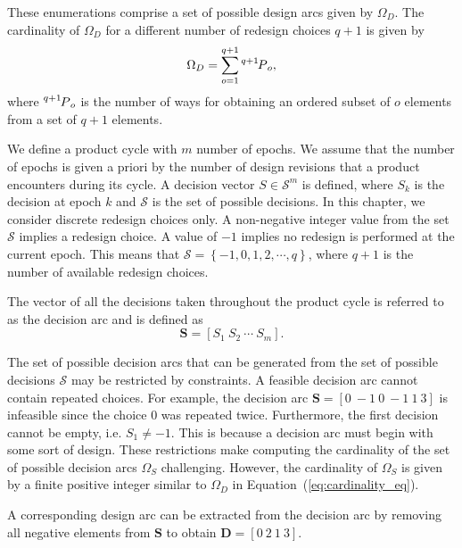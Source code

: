 These enumerations comprise a set of possible design arcs given by $\Omega_D$. The cardinality of $\Omega_D$ for a different number of redesign choices $q+1$ is given by
%
\begin{equation} \label{eq:cardinality_eq}
	\Omega_D = \sum\limits_{o=1}^{q+1}\Myperm[q+1]{o},
\end{equation}
%
where $\Myperm[q+1]{o}$ is the number of ways for obtaining an ordered subset of $o$ elements from a set of $q+1$ elements.

We define a product cycle with $m$ number of epochs. We assume that the number of epochs is given a priori by the number of design revisions that a product encounters during its cycle. A decision vector $S \in \mathcal{S}^m$ is defined, where $S_k$ is the decision at epoch $k$ and $\mathcal{S}$ is the set of possible decisions. In this chapter, we consider discrete redesign choices only. A non-negative integer value from the set $\mathcal{S}$ implies a redesign choice. A value of $-1$ implies no redesign is performed at the current epoch. This means that $\mathcal{S} = \left\{-1,0,1,2,\cdots,q\right\}$, where $q + 1$ is the number of available redesign choices.

The vector of all the decisions taken throughout the product cycle is referred to as the decision arc and is defined as
%
\begin{equation} \label{eq:decisionarc}
	\mathbf{S} = \left[S_1 ~ S_2 ~ \cdots ~ S_m\right].
\end{equation}

The set of possible decision arcs that can be generated from the set of possible decisions $\mathcal{S}$ may be restricted by constraints. A feasible decision arc cannot contain repeated choices. For example, the decision arc $\mathbf{S} = \left[0 ~ -1 ~ 0 ~ -1 ~ 1 ~ 3\right]$ is infeasible since the choice $0$ was repeated twice. Furthermore, the first decision cannot be empty, i.e. $S_1 \neq -1$. This is because a decision arc must begin with some sort of design. These restrictions make computing the cardinality of the set of possible decision arcs $\Omega_S$ challenging. However, the cardinality of $\Omega_S$ is given by a finite positive integer similar to $\Omega_D$ in Equation~(\ref{eq:cardinality_eq}).

A corresponding design arc can be extracted from the decision arc by removing all negative elements from $\mathbf{S}$ to obtain $\mathbf{D} = \left[0 ~ 2 ~ 1 ~ 3\right]$. 

